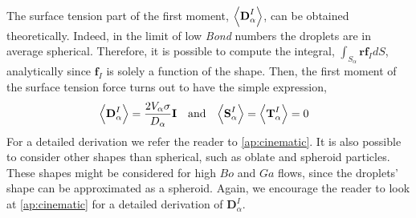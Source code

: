 The surface tension part of the first moment, $\left<\textbf{D}_\alpha^I\right>$, can be obtained theoretically. 
Indeed, in the limit of low \textit{Bond} numbers the droplets are in average spherical.
Therefore, it is possible to compute the integral, $\int_{S_\alpha} \textbf{r} \textbf{f}_I dS$, analytically since $\textbf{f}_I $ is solely a function of the shape.
Then, the first moment of the surface tension force turns out to have the simple expression, 
\begin{align*}
    &\left<\textbf{D}_\alpha^I\right>
    = \frac{2V_\alpha\sigma}{D_\alpha}  \textbf{I}
    &
    \text{and} 
    &&
    \left<\textbf{S}_\alpha^I\right>
    =\left<\textbf{T}_\alpha^I\right>
    = 0&
\end{align*}
For a detailed derivation we refer the reader to \ref{ap:cinematic}. 
It is also possible to consider other shapes than spherical, such as oblate and spheroid particles. 
These shapes might be considered for high $Bo$ and $Ga$ flows, since the droplets' shape can be approximated as a spheroid.
Again, we encourage the reader to look at \ref{ap:cinematic} for a detailed derivation of $\textbf{D}_\alpha^I$.  

